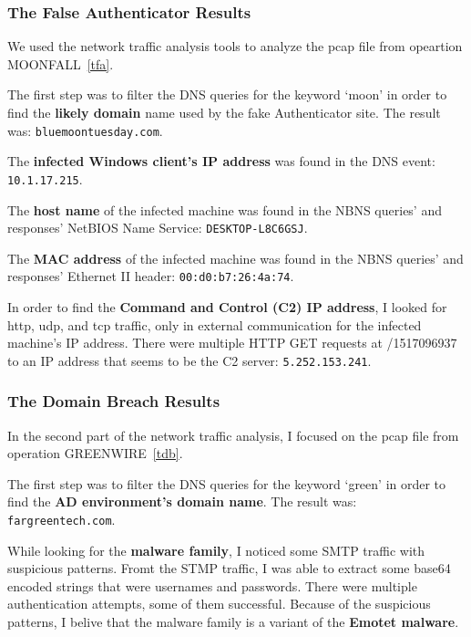 \documentclass[pdflatex,sn-mathphys-num]{sn-jnl}
\begin{document}
\subsubsection{The False Authenticator Results}

\par We used the network traffic analysis tools to analyze the pcap file from opeartion MOONFALL~\ref{tfa}.

\par The first step was to filter the DNS queries for the keyword `moon' in order to find the \textbf{likely domain}
name used by the fake Authenticator site. The result was: \texttt{bluemoontuesday.com}.

\par The \textbf{infected Windows client's IP address} was found in the DNS event: \texttt{10.1.17.215}.

\par The \textbf{host name} of the infected machine was found in the NBNS queries' and responses' NetBIOS Name Service:
\texttt{DESKTOP-L8C6GSJ}.

\par The \textbf{MAC address} of the infected machine was found in the NBNS queries' and responses' Ethernet II header:
\texttt{00:d0:b7:26:4a:74}.

\par In order to find the \textbf{Command and Control (C2) IP address}, I looked for http, udp, and tcp traffic, only
in external communication for the infected machine's IP address. There were multiple HTTP GET requests at /1517096937
to an IP address that seems to be the C2 server: \texttt{5.252.153.241}.

\subsubsection{The Domain Breach Results}

\par In the second part of the network traffic analysis, I focused on the pcap file from operation GREENWIRE~\ref{tdb}.

\par The first step was to filter the DNS queries for the keyword `green' in order to find the \textbf{AD environment's
domain name}. The result was: \texttt{fargreentech.com}.

\par While looking for the \textbf{malware family}, I noticed some SMTP traffic with suspicious patterns. Fromt the STMP
traffic, I was able to extract some base64 encoded strings that were usernames and passwords. There were multiple
authentication attempts, some of them successful. Because of the suspicious patterns, I belive that the malware family
is a variant of the \textbf{Emotet malware}\cite{kuraku2020emotet}.
\end{document}
